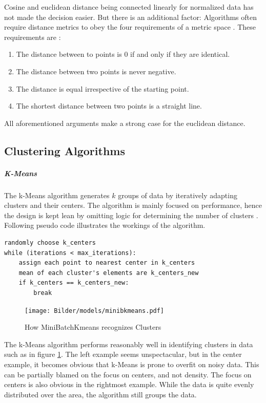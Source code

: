 		Cosine and euclidean distance being connected linearly for normalized data has not made the decision easier. But there is an additional factor: 
		Algorithms often require distance metrics to obey the four requirements of a metric space \cite{schubertTriangleInequalityCosine2021}.
		These requirements are \cite{rajaramanNeighborSearchHigh}:
		\begin{enumerate}
			\item The distance between to points is 0 if and only if they are identical.
			\item The distance between two points is never negative.
			\item The distance is equal irrespective of the starting point.
			\item The shortest distance between two points is a straight line.
		\end{enumerate} 
		
		All aforementioned arguments make a strong case for the euclidean distance.
		
\subsection{Clustering Algorithms}
		
		\subparagraph{K-Means}
		The k-Means algorithm generates $k$ groups of data by iteratively adapting clusters and their centers. The algorithm is mainly focused on performance, hence the design is kept lean by omitting logic for determining the number of clusters \cite[c.~6.2]{40algorithms}. Following pseudo code illustrates the workings of the algorithm.
		
		\begin{lstlisting}
randomly choose k_centers
while (iterations < max_iterations):
	assign each point to nearest center in k_centers
	mean of each cluster's elements are k_centers_new
	if k_centers == k_centers_new:
		break
		\end{lstlisting}
	
			 \begin{figure}[!h]
		\centering
		\texttt{[image: Bilder/models/minibkmeans.pdf]}
		\caption{How MiniBatchKmeans recognizes Clusters \cite{sklearn}}
		\label{fig:kmeans-viz}
		\end{figure}
	
		The k-Means algorithm performs reasonably well in identifying clusters in data such as in figure \ref{fig:kmeans-viz}. The left example seems unspectacular, but in the center example, it becomes obvious that k-Means is prone to overfit on noisy data. This can be partially blamed on the focus on centers, and not density. The focus on centers is also obvious in the rightmost example. While the data is quite evenly distributed over the area, the algorithm still groups the data. 
		
